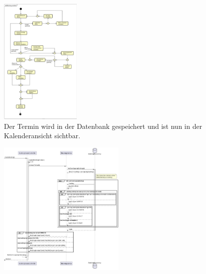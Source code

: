 \documentclass{sdqbeamer}
\begin{document}
\begin{frame}[plain]
    \begin{figure}
        \centering
        \includegraphics[width=0.35\textwidth]{pictures/figures/activity/buchungerstellen}
        \caption{Der Termin wird in der Datenbank gespeichert und ist nun in der Kalenderansicht sichtbar.}
        \label{fig:terminerstellenprozess}
    \end{figure}
\end{frame}

\begin{frame}[plain]
    \begin{figure}
        \centering
        \includegraphics[width=0.55\textwidth]{pictures/figures/activity/SequenzdiagrammBuchungErstellen}
        \label{fig:terminerstellensequenz}
    \end{figure}
\end{frame}
\end{document}
